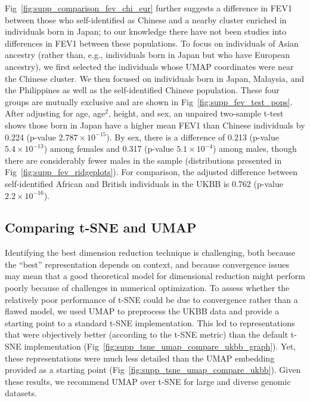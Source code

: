 Fig~\ref{fig:supp_comparison_fev_chi_eur} further suggests a difference in FEV1 between those who self-identified as Chinese and a nearby cluster enriched in individuals born in Japan; to our knowledge there have not been studies into differences in FEV1 between these populations. To focus on individuals of Asian ancestry (rather than, e.g., individuals born in Japan but who have European ancestry), we first selected the individuals whose UMAP coordinates were near the Chinese cluster. We then focused on individuals born in Japan, Malaysia, and the Philippines as well as the self-identified Chinese population. These four groups are mutually exclusive and are shown in Fig~\ref{fig:supp_fev_test_pops}. After adjusting for age, age$^2$, height, and sex, an unpaired two-sample t-test shows those born in Japan have a higher mean FEV1 than Chinese individuals by 0.224 (p-value $2.787\times 10^{-15}$). By sex, there is a difference of 0.213 (p-value $5.4\times 10^{-13}$) among females and 0.317 (p-value $5.1\times 10^{-4}$) among males, though there are considerably fewer males in the sample (distributions presented in Fig~\ref{fig:supp_fev_ridgeplots}). For comparison, the adjusted difference between self-identified African and British individuals in the UKBB is 0.762 (p-value $2.2\times 10^{-16}$).

\subsection{Comparing t-SNE and UMAP}
Identifying the best dimension reduction technique is challenging, both because the ``best'' representation depends on context, and because convergence issues may mean that a good theoretical model for dimensional reduction might perform poorly because of challenges in numerical optimization. To assess whether the relatively poor performance of t-SNE could be due to convergence rather than a flawed model, we used UMAP to preprocess the UKBB data and provide a starting point to a standard t-SNE implementation. This led to representations that were objectively better (according to the t-SNE metric) than the default t-SNE implementation (Fig~\ref{fig:supp_tsne_umap_compare_ukbb_graph}). Yet, these representations were much less detailed than the UMAP embedding provided as a starting point (Fig~\ref{fig:supp_tsne_umap_compare_ukbb}).  Given these results, we recommend UMAP over t-SNE for large and diverse genomic datasets.

